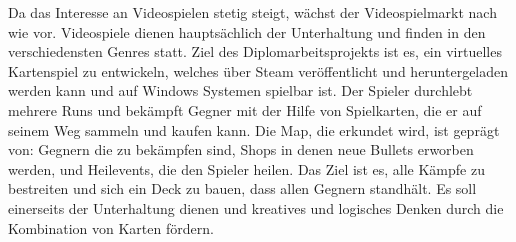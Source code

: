 %
Da das Interesse an Videospielen stetig steigt, wächst der Videospielmarkt nach wie vor. Videospiele dienen hauptsächlich der Unterhaltung  und finden in den verschiedensten Genres statt.
Ziel des Diplomarbeitsprojekts ist es, ein virtuelles Kartenspiel zu entwickeln, welches über Steam veröffentlicht und heruntergeladen werden kann und auf Windows Systemen spielbar ist. Der Spieler durchlebt mehrere Runs und bekämpft Gegner mit der Hilfe von Spielkarten, die er auf seinem Weg sammeln und kaufen kann. Die Map, die erkundet wird, ist geprägt von: Gegnern die zu bekämpfen sind, Shops in denen neue Bullets erworben werden, und Heilevents, die den Spieler heilen. Das Ziel ist es, alle Kämpfe zu bestreiten und sich ein Deck zu bauen, dass allen Gegnern standhält.
Es soll einerseits der Unterhaltung dienen und kreatives und logisches Denken durch die Kombination von Karten fördern.
%
